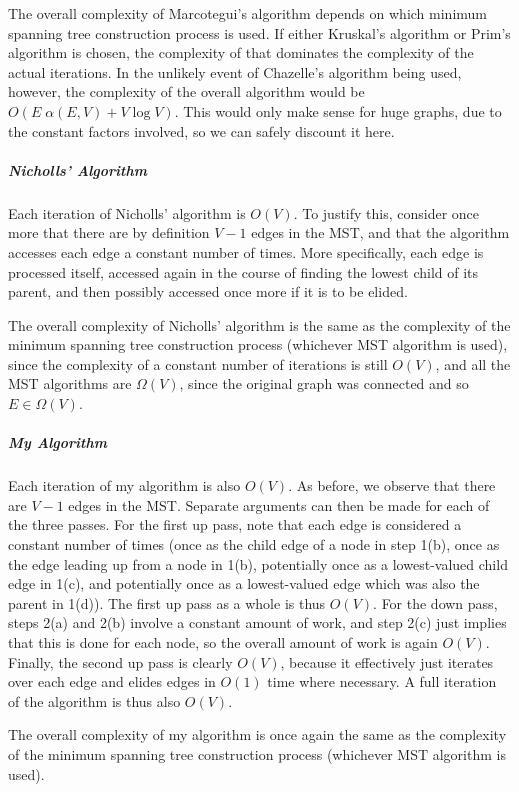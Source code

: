 The overall complexity of Marcotegui's algorithm depends on which minimum spanning tree construction process is used. If either Kruskal's algorithm or Prim's algorithm is chosen, the complexity of that dominates the complexity of the actual iterations. In the unlikely event of Chazelle's algorithm being used, however, the complexity of the overall algorithm would be $O(E \; \alpha(E,V) + V \log V)$. This would only make sense for huge graphs, due to the constant factors involved, so we can safely discount it here.

\subparagraph{Nicholls' Algorithm}

Each iteration of Nicholls' algorithm is $O(V)$. To justify this, consider once more that there are by definition $V - 1$ edges in the MST, and that the algorithm accesses each edge a constant number of times. More specifically, each edge is processed itself, accessed again in the course of finding the lowest child of its parent, and then possibly accessed once more if it is to be elided.

The overall complexity of Nicholls' algorithm is the same as the complexity of the minimum spanning tree construction process (whichever MST algorithm is used), since the complexity of a constant number of iterations is still $O(V)$, and all the MST algorithms are $\Omega(V)$, since the original graph was connected and so $E \in \Omega(V)$.

\subparagraph{My Algorithm}

Each iteration of my algorithm is also $O(V)$. As before, we observe that there are $V - 1$ edges in the MST. Separate arguments can then be made for each of the three passes. For the first up pass, note that each edge is considered a constant number of times (once as the child edge of a node in step 1(b), once as the edge leading up from a node in 1(b), potentially once as a lowest-valued child edge in 1(c), and potentially once as a lowest-valued edge which was also the parent in 1(d)). The first up pass as a whole is thus $O(V)$. For the down pass, steps 2(a) and 2(b) involve a constant amount of work, and step 2(c) just implies that this is done for each node, so the overall amount of work is again $O(V)$. Finally, the second up pass is clearly $O(V)$, because it effectively just iterates over each edge and elides edges in $O(1)$ time where necessary. A full iteration of the algorithm is thus also $O(V)$.

The overall complexity of my algorithm is once again the same as the complexity of the minimum spanning tree construction process (whichever MST algorithm is used).

